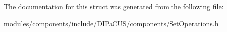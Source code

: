 The documentation for this struct was generated from the following file\+:\begin{DoxyCompactItemize}
\item 
modules/components/include/\+D\+I\+Pa\+C\+U\+S/components/\mbox{\hyperlink{SetOperations_8h}{Set\+Operations.\+h}}\end{DoxyCompactItemize}
